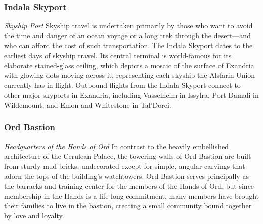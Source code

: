 \documentclass[10pt,a4,twoside,twocolumn,openany,nodeprecatedcode]{dndbook}
\begin{document}
\subsubsection{Indala Skyport}
\textit{Skyship Port}
Skyship travel is undertaken primarily by those who want to avoid the time and danger of an ocean voyage or a long trek through the desert—and who can afford the cost of such transportation. The Indala Skyport dates to the earliest days of skyship travel. Its central terminal is world-famous for its elaborate stained-glass ceiling, which depicts a mosaic of the surface of Exandria with glowing dots moving across it, representing each skyship the Alsfarin Union currently has in flight.
Outbound flights from the Indala Skyport connect to other major skyports in Exandria, including Vasselheim in Issylra, Port Damali in Wildemount, and Emon and Whitestone in Tal'Dorei.
\subsubsection{Ord Bastion}
\textit{Headquarters of the Hands of Ord}
In contrast to the heavily embellished architecture of the Cerulean Palace, the towering walls of Ord Bastion are built from sturdy mud bricks, undecorated except for simple, angular carvings that adorn the tops of the building's watchtowers.
Ord Bastion serves principally as the barracks and training center for the members of the Hands of Ord, but since membership in the Hands is a life-long commitment, many members have brought their families to live in the bastion, creating a small community bound together by love and loyalty.
\end{document}
